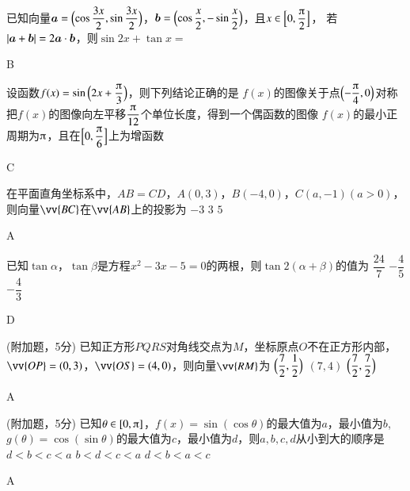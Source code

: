 \begin{exercise}
      已知向量$\bm a=\Bigl(\cos\dfrac{3x}2,\sin\dfrac{3x}2\Bigr)$，$\bm b=\Bigl(\cos\dfrac{x}2,-\sin\dfrac{x}2\Bigr)$，且$x\in\Bigl[0,\dfrac{\piup}2\Bigr]$，
      若$\left| \bm a+\bm b \right|=2\bm a\cdot\bm b$，则$\sin{2x}+\tan{x}=$\xz
      \begin{answer}
        B
      \end{answer}
    \item%
      设函数$f(x)=\sin{\Bigl(2x+\dfrac{\piup}3\Bigr)}$，则下列结论正确的是\xz
        {$f(x)$的图像关于点$\Bigl(-\dfrac{\piup}4,0\Bigr)$对称}
        {把$f(x)$的图像向左平移$\dfrac{\piup}{12}$个单位长度，得到一个偶函数的图像}
        {$f(x)$的最小正周期为$\piup$，且在$\Bigl[0,\dfrac{\piup}6 \Bigr]
        $上为增函数}
      \begin{answer}
        C
      \end{answer}
    \item%
      在平面直角坐标系中，$AB=CD$，$A(0,3)$，$B(-4,0)$，$C(a,-1)(a>0)$，则向量$\vv{BC}$在$\vv{AB}$上的投影为\xz
          {$-3$}
          {$3$}
          {$5$}
      \begin{answer}
        A
      \end{answer}
    \item%
      已知$\tan\alpha$，$\tan\beta$是方程$x^2-3x-5=0$的两根，则$\tan{2(\alpha+\beta)}$的值为\xz
          {$\dfrac{24}7$}
          {$-\dfrac{4}{5}$}
          {$-\dfrac{4}{3}$}
      \begin{answer}
        D
      \end{answer}
    \item%
      (附加题，5分)
      已知正方形$PQRS$对角线交点为$M$，坐标原点$O$不在正方形内部，$\vv{OP}=(0,3)$，$\vv{OS}=(4,0)$，则向量$\vv{RM}$为\xz
        {$\Bigl(\dfrac{7}{2},\dfrac{1}{2}\Bigr)$}
        {$(7,4)$}
        {$\Bigl(\dfrac{7}{2},\dfrac{7}{2}\Bigr)$}
      \begin{answer}
        A
      \end{answer}
    \item%
      (附加题，5分)
      已知$\theta\in[0,\piup]$，$f(x)=\sin{(\cos\theta)}$的最大值为$a$，最小值为$b$,$g(\theta)=\cos{(\sin\theta)}$的最大值为$c$，最小值为$d$，则$a,b,c,d$从小到大的顺序是\xz
        {$d<b<c<a$}
        {$b<d<c<a$}
        {$d<b<a<c$}
      \begin{answer}
        A
      \end{answer}

\end{exercise}
